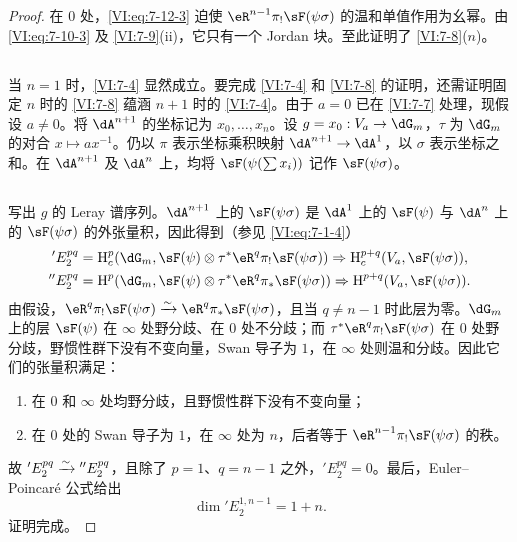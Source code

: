 \begin{proof}
在 $0$ 处，\eqref{VI:eq:7-12-3} 迫使 $\eR^{n-1}\pi_!\sF(\psi\sigma)$ 的温和单值作用为幺幂。由 \eqref{VI:eq:7-10-3} 及 \ref{VI:7-9}(ii)，它只有一个 Jordan 块。至此证明了 \ref{VI:7-8}($n$)。

\subsection{}\label{VI:7-13}
当 $n=1$ 时，\ref{VI:7-4} 显然成立。要完成 \ref{VI:7-4} 和 \ref{VI:7-8} 的证明，还需证明固定 $n$ 时的 \ref{VI:7-8} 蕴涵 $n+1$ 时的 \ref{VI:7-4}。由于 $a=0$ 已在 \ref{VI:7-7} 处理，现假设 $a\ne0$。将 $\dA^{n+1}$ 的坐标记为 $x_0,\ldots,x_n$。设 $g=x_0:V_a\to\dG_m$，$\tau$ 为 $\dG_m$ 的对合 $x\mapsto ax^{-1}$。仍以 $\pi$ 表示坐标乘积映射 $\dA^{n+1}\to\dA^1$，以 $\sigma$ 表示坐标之和。在 $\dA^{n+1}$ 及 $\dA^n$ 上，均将 $\sF(\psi(\sum x_i))$ 记作 $\sF(\psi\sigma)$。

\subsection{}\label{VI:7-14}
写出 $g$ 的 Leray 谱序列。$\dA^{n+1}$ 上的 $\sF(\psi\sigma)$ 是 $\dA^1$ 上的 $\sF(\psi)$ 与 $\dA^n$ 上的 $\sF(\psi\sigma)$ 的外张量积，因此得到（参见 \eqref{VI:eq:7-1-4}）
\begin{align*}
{}'E_2^{pq}
&=\h_c^p(\dG_m,\sF(\psi)\otimes\tau^\ast\eR^q\pi_!\sF(\psi\sigma))
\Rightarrow\h_c^{p+q}(V_a,\sF(\psi\sigma)),\\
{}''E_2^{pq}
&=\h^p(\dG_m,\sF(\psi)\otimes\tau^\ast\eR^q\pi_\ast\sF(\psi\sigma))
\Rightarrow\h^{p+q}(V_a,\sF(\psi\sigma)).
\end{align*}
由假设，$\eR^q\pi_!\sF(\psi\sigma)\iso\eR^q\pi_\ast\sF(\psi\sigma)$，且当 $q\ne n-1$ 时此层为零。$\dG_m$ 上的层 $\sF(\psi)$ 在 $\infty$ 处野分歧、在 $0$ 处不分歧；而 $\tau^\ast\eR^q\pi_!\sF(\psi\sigma)$ 在 $0$ 处野分歧，野惯性群下没有不变向量，Swan 导子为 $1$，在 $\infty$ 处则温和分歧。因此它们的张量积满足：
\begin{enumerate}[\indent a)]
\item 在 $0$ 和 $\infty$ 处均野分歧，且野惯性群下没有不变向量；
\item 在 $0$ 处的 Swan 导子为 $1$，在 $\infty$ 处为 $n$，后者等于 $\eR^{n-1}\pi_!\sF(\psi\sigma)$ 的秩。
\end{enumerate}
故 ${}'E_2^{pq}\xrightarrow\sim{}''E_2^{pq}$，且除了 $p=1$、$q=n-1$ 之外，${}'E_2^{pq}=0$。最后，Euler--Poincaré 公式给出
\[\dim{}'E_2^{1,n-1}=1+n.\]
证明完成。
\end{proof}

